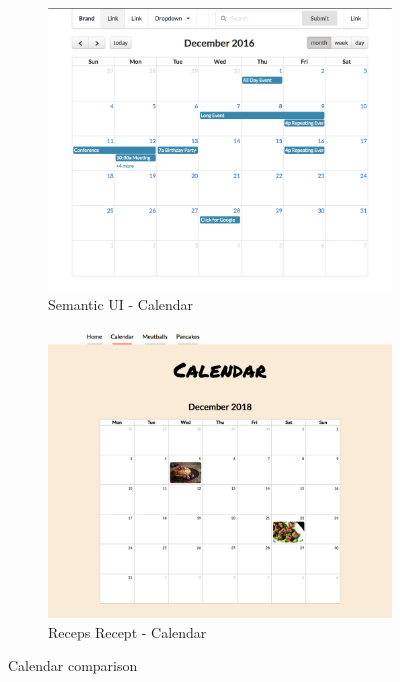 \documentclass[a4paper]{scrartcl}
\begin{document}
\begin{figure}
	\centering
	\begin{subfigure}[b]{0.45\linewidth}
		\includegraphics[width=\linewidth]{images/Semantic_UI-calendar.png}
		\caption{Semantic UI - Calendar}
	\end{subfigure}
	\begin{subfigure}[b]{0.45\linewidth}
		\includegraphics[width=\linewidth]{images/calendar.png}
		\caption{Receps Recept - Calendar}
	\end{subfigure}
	\caption{Calendar comparison}
	\label{fig:calendar-comparison}
\end{figure}
\end{document}
